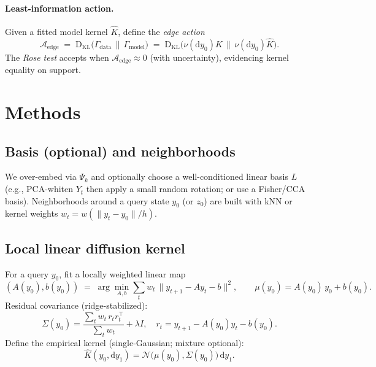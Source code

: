 \documentclass[11pt]{article}
\newcommand{\KL}{\mathrm{D}_{\mathrm{KL}}}
\newcommand{\T}{\top}
\newcommand{\Khat}{\widehat{K}}
\begin{document}
\paragraph{Least-information action.}
Given a fitted model kernel $\Khat$, define the \emph{edge action}
\begin{equation}
\label{eq:edge-action}
\mathcal{A}_{\text{edge}}
\;=\;
\KL\!\big(\Gamma_{\text{data}} \,\|\, \Gamma_{\text{model}}\big)
\;=\;
\KL\!\big(\nu(\mathrm{d}y_0)K\,\|\,\nu(\mathrm{d}y_0)\Khat\big).
\end{equation}
The \emph{Rose test} accepts when $\mathcal{A}_{\text{edge}}\approx 0$ (with uncertainty), evidencing kernel equality on support.

\section{Methods}
\label{sec:methods}

\subsection{Basis (optional) and neighborhoods}
\label{subsec:basis}
We over-embed via $\Psi_k$ and optionally choose a well-conditioned linear basis $L$ (e.g., PCA-whiten $Y_t$ then apply a small random rotation; or use a Fisher/CCA basis). Neighborhoods around a query state $y_0$ (or $z_0$) are built with kNN or kernel weights $w_t=w(\|y_t-y_0\|/h)$.

\subsection{Local linear diffusion kernel}
\label{subsec:kernel}
For a query $y_0$, fit a locally weighted linear map
\begin{equation}
\label{eq:local-mean}
(A(y_0),b(y_0)) \;=\; \arg\min_{A,b} \sum_t w_t\,\|y_{t+1}-A y_t - b\|^2,
\qquad
\mu(y_0)=A(y_0)\,y_0+b(y_0).
\end{equation}
Residual covariance (ridge-stabilized):
\begin{equation}
\label{eq:local-cov}
\Sigma(y_0)
=
\frac{\sum_t w_t\, r_t r_t^\T}{\sum_t w_t}
+\lambda I,
\quad
r_t=y_{t+1}-A(y_0) y_t - b(y_0).
\end{equation}
Define the empirical kernel (single-Gaussian; mixture optional):
\begin{equation}
\label{eq:kernel}
\Khat(y_0,\mathrm{d}y_1)=\mathcal{N}\!\big(\mu(y_0),\Sigma(y_0)\big)\,\mathrm{d}y_1.
\end{equation}
\end{document}
